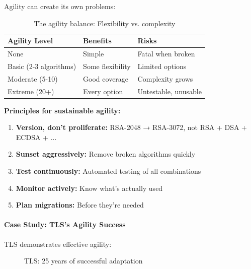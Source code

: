 \documentclass[11pt,a4paper]{article}
\begin{document}
Agility can create its own problems:

\begin{table}[h]
\centering
\begin{tabular}{|l|l|l|}
\hline
\textbf{Agility Level} & \textbf{Benefits} & \textbf{Risks} \\
\hline
None & Simple & Fatal when broken \\
Basic (2-3 algorithms) & Some flexibility & Limited options \\
Moderate (5-10) & Good coverage & Complexity grows \\
Extreme (20+) & Every option & Untestable, unusable \\
\hline
\end{tabular}
\caption{The agility balance: Flexibility vs. complexity}
\end{table}

\textbf{Principles for sustainable agility:}
\begin{enumerate}
    \item \textbf{Version, don't proliferate:} RSA-2048 → RSA-3072, not RSA + DSA + ECDSA + ...
    \item \textbf{Sunset aggressively:} Remove broken algorithms quickly
    \item \textbf{Test continuously:} Automated testing of all combinations
    \item \textbf{Monitor actively:} Know what's actually used
    \item \textbf{Plan migrations:} Before they're needed
\end{enumerate}

\paragraph{Case Study: TLS's Agility Success}

TLS demonstrates effective agility:

\begin{figure}[h]
\centering
{}
\caption{TLS: 25 years of successful adaptation}
\end{figure}
\end{document}
